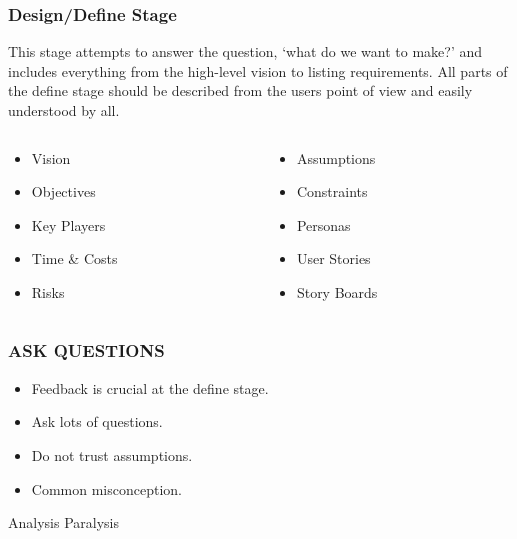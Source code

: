 \begin{frame}
	\frametitle{ Design/Define Stage}
	This stage attempts to answer the question, `what do we want to make?' and includes everything from the high-level vision to listing requirements. All parts of the define stage should be described from the users point of view and easily understood by all. 
	\pause
	\begin{columns}
		\begin{column}{0.5\textwidth}
			\begin{itemize}
				\item Vision
				\item Objectives 
				\item Key Players				
				\item Time \& Costs
				\item Risks
			\end{itemize}
   		\end{column}
		
		\begin{column}{0.5\textwidth}  
			\begin{itemize}
				\item Assumptions
				\item Constraints
				\item Personas		
				\item User Stories
				\item Story Boards
			\end{itemize}
		\end{column}
	\end{columns}
\end{frame}

\begin{frame}
	\frametitle{\textbf{ASK QUESTIONS}}
	\begin{itemize}
		\item Feedback is crucial at the define stage. 
		\item Ask lots of questions.
		\item Do not trust assumptions. 
		\item Common misconception.
	\end{itemize}
\end{frame}

\begin{frame}
	\begin{center}
		\Huge{Analysis Paralysis }
	\end{center}
\end{frame}


